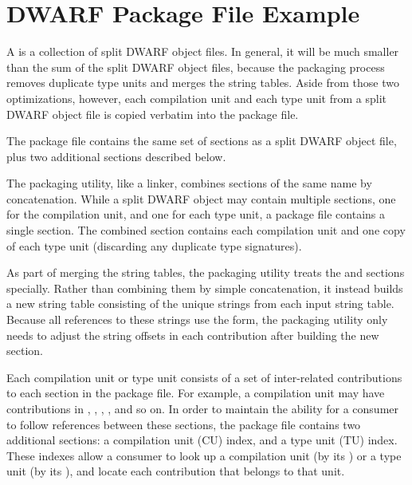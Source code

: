 \clearpage
\section{DWARF Package File Example}
\label{app:dwarfpackagefileexample}

\bb
A  is a collection of split 
DWARF object files.
In general, it will be much smaller than the sum of the split
DWARF object files, because the packaging process removes duplicate
type units and merges the string tables. Aside from those two
optimizations, however, each compilation unit and each type unit
from a split DWARF object file is copied verbatim into the package
file.

The package file contains the same set of sections as a split
DWARF object file, plus two additional sections described below.

The packaging utility, like a linker, combines sections of the
same name by concatenation. While a split DWARF object may
contain multiple \dotdebuginfodwo{} sections, one for the
compilation unit, and one for each type unit, a package file
contains a single \dotdebuginfodwo{} section. The combined
\dotdebuginfodwo{} section contains each compilation unit and one
copy of each type unit (discarding any duplicate type
signatures).

As part of merging the string tables, the packaging utility
treats the \dotdebugstrdwo{} and \dotdebugstroffsetsdwo{}
sections specially. Rather than
combining them by simple concatenation, it instead builds a new
string table consisting of the unique strings from each input
string table. Because all references to these strings use the
\DWFORMstrx{} form, the packaging utility only needs to adjust the
string offsets in each \dotdebugstroffsetsdwo{} contribution after
building the new \dotdebugstrdwo{} section.

Each compilation unit or type unit consists of a set of
inter-related contributions to each section in the package file.
For example, a compilation unit may have contributions in
\dotdebuginfodwo{}, \dotdebugabbrevdwo{}, \dotdebuglinedwo{},
\dotdebugstroffsetsdwo{}, and so on. In order to maintain the ability 
for a consumer to follow references between these sections, the
package file contains two additional sections: a compilation unit
(CU) index, and a type unit (TU) index. These indexes allow a
consumer to look up a compilation unit (by its \CUsignature) or 
a type unit (by its \TUsignature), and locate each contribution 
that belongs to that unit.

